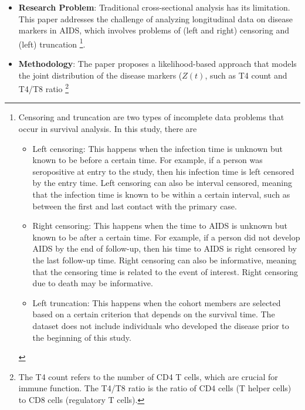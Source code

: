 \documentclass[UTF8,a4paper,10pt]{article}
\begin{document}
\begin{itemize}
  \item \textbf{Research Problem}: Traditional cross-sectional analysis has its limitation. This paper addresses the challenge of analyzing longitudinal data on disease markers in AIDS, which involves problems of (left and right) censoring and (left) truncation
  \footnote{Censoring and truncation are two types of incomplete data problems that occur in survival analysis. In this study, there are
  
  \begin{itemize}
    \item Left censoring: This happens when the infection time is unknown but known to be before a certain time. For example, if a person was seropositive at entry to the study, then his infection time is left censored by the entry time. Left censoring can also be interval censored, meaning that the infection time is known to be within a certain interval, such as between the first and last contact with the primary case.
    \item Right censoring: This happens when the time to AIDS is unknown but known to be after a certain time. For example, if a person did not develop AIDS by the end of follow-up, then his time to AIDS is right censored by the last follow-up time. Right censoring can also be informative, meaning that the censoring time is related to the event of interest. Right censoring due to death may be informative.
    \item Left truncation: This happens when the cohort members are selected based on a certain criterion that depends on the survival time. The dataset does not include individuals who developed the disease prior to the beginning of this study.
  \end{itemize}
  }.
  \item \textbf{Methodology}: The paper proposes a likelihood-based approach that models the joint distribution of the disease markers (\(Z(t)\), such as T4 count and T4/T8 ratio
  \footnote{The T4 count refers to the number of CD4 T cells, which are crucial for immune function. The T4/T8 ratio is the ratio of CD4 cells (T helper cells) to CD8 cells (regulatory T cells).}

\end{itemize}
\end{document}
